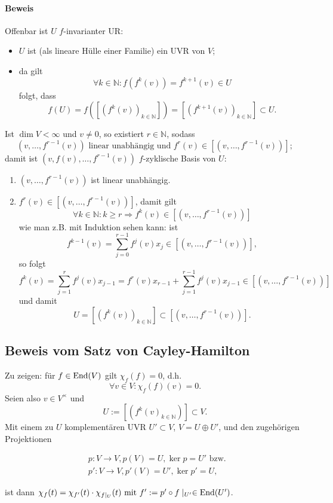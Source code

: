 \paragraph{Beweis}
	Offenbar ist $ U $ $ f $-invarianter UR:
	\begin{itemize}
		\item $ U $ ist (als lineare Hülle einer Familie) ein UVR von $ V $;
		\item da gilt
			\[ \forall k\in \mathbb{N}: f\left(f^k(v)\right)=f^{k+1}(v)\in U \]
		folgt, dass
			\[f(U) = f\left(\left[\left(f^k(v)\right)_{k\in{\mathbb{N}}}\right]\right) = \left[\left(f^{k+1}(v)\right)_{k\in{\mathbb{N}}}\right]\subset U. \]
	\end{itemize}
	Ist $ \dim V < \infty $ und $ v\neq 0 $, so existiert $ r\in \mathbb{N} $, sodass
		\[ \left(v,\dots,f^{r-1}(v)\right) \text{ linear unabhängig und }f^r(v)\in\left[\left(v,\dots,f^{r-1}(v)\right)\right]; \]
	damit ist $ \left(v,f(v),\dots, f^{r-1}(v)\right) $ $ f $-zyklische Basis von $ U $:
	\begin{enumerate}
		\item $ \left(v,\dots,f^{r-1}(v) \right) $ ist linear unabhängig.
		\item $ f^r(v) \in \left[\left(v,\dots,f^{r-1}(v)\right)\right]$, damit gilt
		\[ \forall k\in \mathbb{N}: k\geq r \Rightarrow f^k(v)\in \left[\left(v,\dots,f^{r-1}(v)\right)\right] \]
		wie man z.B. mit Induktion sehen kann: ist
			\[ f^{k-1}(v) = \sum_{j=0}^{r-1}f^j(v)x_j \in \left[\left(v,\dots,f^{r-1}(v)\right) \right], \]
		so folgt
			\[ f^k(v) = \sum_{j=1}^{r}f^j(v)x_{j-1}=f^{r}(v)x_{r-1}+\sum_{j=1}^{r-1}f^j(v)x_{j-1}\in \left[\left(v,\dots,f^{r-1}(v)\right)\right] \]
		und damit
			\[ U = \left[\left(f^k(v)\right)_{k\in \mathbb{N}}\right]\subset \left[\left(v,\dots,f^{r-1}(v)\right)\right]. \]
	\end{enumerate}
		
\subsection{Beweis vom Satz von Cayley-Hamilton}
	Zu zeigen: für $ f\in \operatorname{End}(V) $ gilt $ \chi_f(f)=0 $, d.h.
		\[ \forall v\in V:\chi_f(f)(v) = 0. \]
	Seien also $ v\in V^\times $ und
		\[ U := \left[\left( f^k(v)_{k\in \mathbb{N}}\right)\right]\subset V. \]
	Mit einem zu $ U $ komplementären UVR $ U'\subset V $, $ V=U\oplus U' $, und den zugehörigen Projektionen
	
	\begin{multicols}{2}
 	\begin{figure}[H]\centering
 		
	\end{figure}
	    \begin{align*}
		    &p: V\to V, p(V) = U, \ker p = U' \text{ bzw. } \\
		    &p':V\to V, p'(V) = U', \ker p' = U,
	    \end{align*}
	\end{multicols}
	ist dann $ \chi_f(t) = \chi_{f'}(t)\cdot \chi_{f\mid_U}(t) \text{ mit } f' := p'\circ f\mid_{U'}\in \operatorname{End}(U') $.
	
